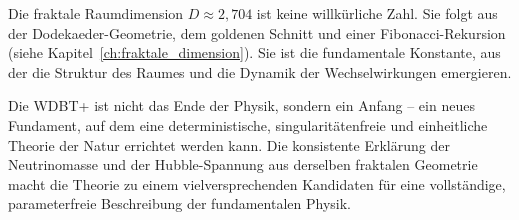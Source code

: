 Die fraktale Raumdimension \( D \approx 2,704 \) ist keine willkürliche Zahl. Sie folgt aus der Dodekaeder-Geometrie, dem goldenen Schnitt und einer Fibonacci-Rekursion (siehe Kapitel~\ref{ch:fraktale_dimension}). Sie ist die fundamentale Konstante, aus der die Struktur des Raumes und die Dynamik der Wechselwirkungen emergieren.

Die WDBT+ ist nicht das Ende der Physik, sondern ein Anfang – ein neues Fundament, auf dem eine deterministische, singularitätenfreie und einheitliche Theorie der Natur errichtet werden kann. Die konsistente Erklärung der Neutrinomasse und der Hubble-Spannung aus derselben fraktalen Geometrie macht die Theorie zu einem vielversprechenden Kandidaten für eine vollständige, parameterfreie Beschreibung der fundamentalen Physik.